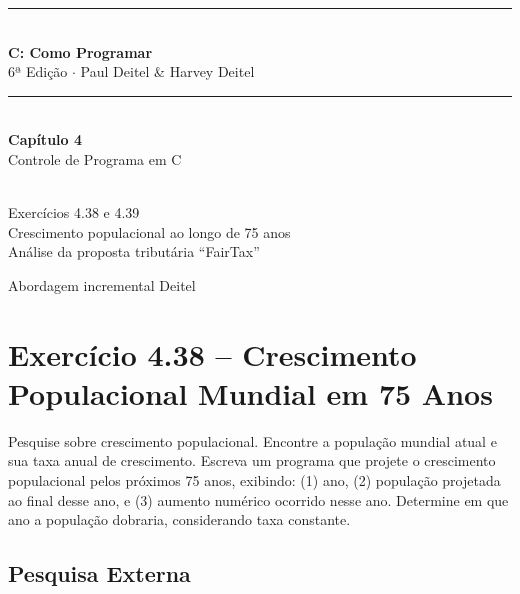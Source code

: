 \documentclass[12pt,a4paper]{article}
\begin{document}
\begin{titlepage}
  \centering\vspace*{2cm}
  {\color{deitelblue}\rule{\linewidth}{2pt}}\\[0.4cm]
  {\huge\bfseries\color{deitelblue}C: Como Programar}\\[0.2cm]
  {\large\color{deitelblue}6ª Edição $\cdot$ Paul Deitel \& Harvey Deitel}\\[0.2cm]
  {\color{deitelblue}\rule{\linewidth}{2pt}}\\[1cm]
  {\LARGE\bfseries Capítulo 4}\\[0.3cm]
  {\Large\color{deitelblue!80}Controle de Programa em C}\\[0.8cm]
  \begin{tcolorbox}[colback=ecolightgreen,colframe=ecogreen,width=0.85\linewidth]
    \\[0.3cm]
    {\normalsize Exercícios 4.38 e 4.39\\[0.2cm]
    Crescimento populacional ao longo de 75 anos\\
    Análise da proposta tributária ``FairTax''}
  \end{tcolorbox}
  \vfill{\small Abordagem incremental Deitel}
\end{titlepage}

\tableofcontents\newpage

\section{Exercício 4.38 -- Crescimento Populacional Mundial em 75 Anos}

\begin{enunciadoBox}[Enunciado 4.38]
Pesquise sobre crescimento populacional. Encontre a população mundial atual e sua taxa
anual de crescimento. Escreva um programa que projete o crescimento populacional pelos
próximos 75 anos, exibindo: (1) ano, (2) população projetada ao final desse ano, e
(3) aumento numérico ocorrido nesse ano. Determine em que ano a população dobraria,
considerando taxa constante.
\end{enunciadoBox}

\subsection*{Pesquisa Externa}
\end{document}
